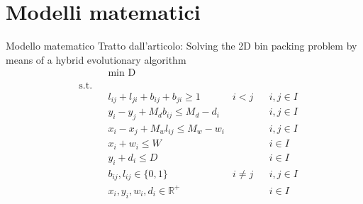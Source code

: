 \documentclass{beamer}
\begin{document}
\section{Modelli matematici}
\begin{frame}{Modello matematico}
	Tratto dall'articolo: Solving the 2D bin packing problem by means of a hybrid evolutionary algorithm
	\begin{align*}
		& & &\underset{}{\text{min D}} \\
		& \text{s.t.} \\
		  &   &   & l_{ij} + l_{ji} + b_{ij} + b_{ji} \geq 1      & i < j    &   & i,j \in I \\
		  &   &   & y_i - y_j + M_d b_{ij} \leq M_d - d_i         &          &   & i,j \in I \\
		  &   &   & x_i - x_j + M_w l_{ij} \leq M_w - w_i         &          &   & i,j \in I \\
		  &   &   & x_i + w_i \leq W                              &          &   & i \in I   \\
		  &   &   & y_i + d_i \leq D                              &          &   & i \in I   \\
		  &   &   & b_{ij}, l_{ij} \in \{0,1\}                    & i \neq j &   & i,j \in I \\
		  &   &   & x_{i}, y_{i}, w_{i}, d_{i} \in \mathbb{R}^{+} &          &   & i \in I   
	\end{align*}
\end{frame}
\end{document}

